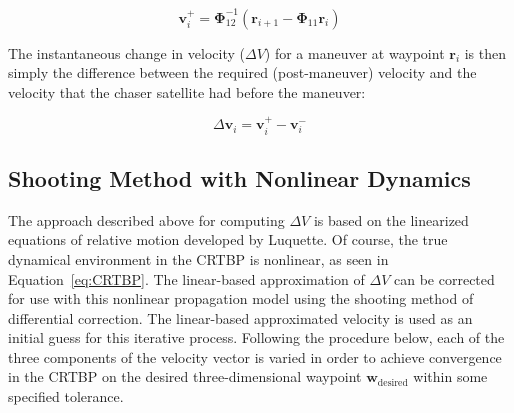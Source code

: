 \documentclass[letterpaper, preprint, paper,11pt]{AAS}	%
\begin{document}


\begin{equation} \label{eq:RequiredVelocity}
	\mathbf{v}_i^+ = \boldsymbol{\Phi}_{12}^{-1}(\mathbf{r}_{i+1} - \boldsymbol{\Phi}_{11}\mathbf{r}_i)
\end{equation}

The instantaneous change in velocity (\(\Delta V\)) for a maneuver at waypoint \(\mathbf{r}_i\) is then simply the difference between the required (post-maneuver) velocity and the velocity that the chaser satellite had before the maneuver:

\begin{equation} \label{eq:DeltaV}
	\Delta \mathbf{v}_i = \mathbf{v}_i^+ - \mathbf{v}_i^-
\end{equation}

\subsection{Shooting Method with Nonlinear Dynamics} \label{sec:shooting}
The approach described above for computing \(\Delta V\) is based on the linearized equations of relative motion developed by Luquette.  Of course, the true dynamical environment in the CRTBP is nonlinear, as seen in Equation~\eqref{eq:CRTBP}. The linear-based approximation of \(\Delta V\) can be corrected for use with this nonlinear propagation model using the shooting method of differential correction.  The linear-based approximated velocity is used as an initial guess for this iterative process.  Following the procedure below, each of the three components of the velocity vector is varied in order to achieve convergence in the CRTBP on the desired three-dimensional waypoint \(\mathbf{w}_{\mathrm{desired}}\) within some specified tolerance.
\end{document}
